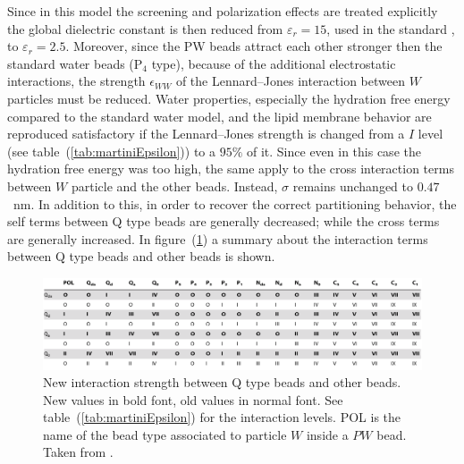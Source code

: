 Since in this model the screening and polarization effects are treated explicitly the global dielectric constant
is then reduced from $\varepsilon_r = 15$, used in the standard \martini, to $\varepsilon_r = 2.5$. Moreover,
since the \ac{PW} beads attract each other stronger then the standard water beads (P$_4$ type), because of the additional electrostatic interactions, the strength $\epsilon_{WW}$ of the Lennard--Jones interaction between $W$ particles must be reduced. Water properties, especially the hydration free energy compared to the standard water model, and the lipid membrane behavior are reproduced satisfactory if the Lennard--Jones strength is changed from a
$I$ level (see table~(\ref{tab:martiniEpsilon})) to a $95\% $ of it. Since even in this case the hydration free energy was too high, the same apply to the cross interaction terms between $W$ particle and the other \martini beads. Instead, $\sigma$ remains unchanged to $0.47$~nm. In addition to this, in order to recover the correct partitioning behavior, the self terms between Q type beads are generally decreased; while the cross terms are generally increased. In figure~(\ref{fig:PWMartini}) a summary about the interaction terms between Q type beads and other beads is shown.
\begin{figure}[!ht]
	\centering
	\includegraphics[width=\textwidth]{./img/PWMartini}
	\caption{New interaction strength between Q type beads and other beads. New values in bold font, old values in normal font. See table~(\ref{tab:martiniEpsilon}) for the interaction levels. POL is the name of the \martini bead type associated to particle $W$ inside a $PW$ bead. Taken from \cite{PW}.}
	\label{fig:PWMartini}
\end{figure}

